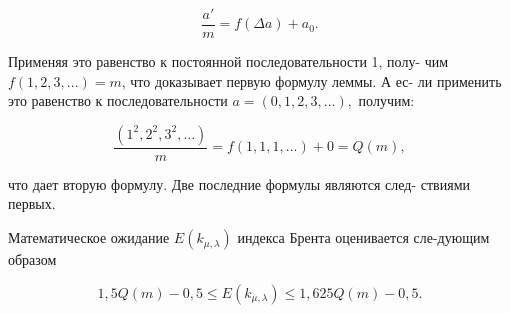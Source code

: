 \documentclass{../template/mai_book}
\begin{document}
\begin{myproof}
 $$\frac{a'}{m} = f(\Delta a) + a_{0}.$$ \par
 
\noindent Применяя это равенство к постоянной последовательности 1, полу- \linebreak чим $f(1,2,3,...) = m$, \noindent что доказывает первую формулу леммы. А ес- \linebreak ли применить это равенство к последовательности $a =(0,1,2,3,...),$ получим: \par 
 
 $$\frac{(1^{2}, 2^{2}, 3^{2},...)}{m} = f(1,1,1,...) + 0 = Q(m),$$ \par 
 что дает вторую формулу. Две последние формулы являются след- \linebreak ствиями первых. \par
\end{myproof}
\begin{predl} 
 \slshape{Математическое ожидание $E(k_{\mu, \lambda})$ индекса Брента оценивается сле-\linebreak дующим образом \par }
 
 $$1,5Q(m) - 0,5 \leqslant E(k_{\mu, \lambda}) \leqslant 1,625Q(m) - 0,5.$$ \par 
 \end{predl}
\end{document}

